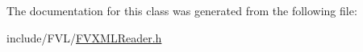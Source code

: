 \label{d2/d9a/classFVL_1_1FVXMLReader_ac0466143984e67ba108883aa9d569eaa}


The documentation for this class was generated from the following file:\begin{DoxyCompactItemize}
\item 
include/FVL/\hyperlink{FVXMLReader_8h}{FVXMLReader.h}\end{DoxyCompactItemize}
